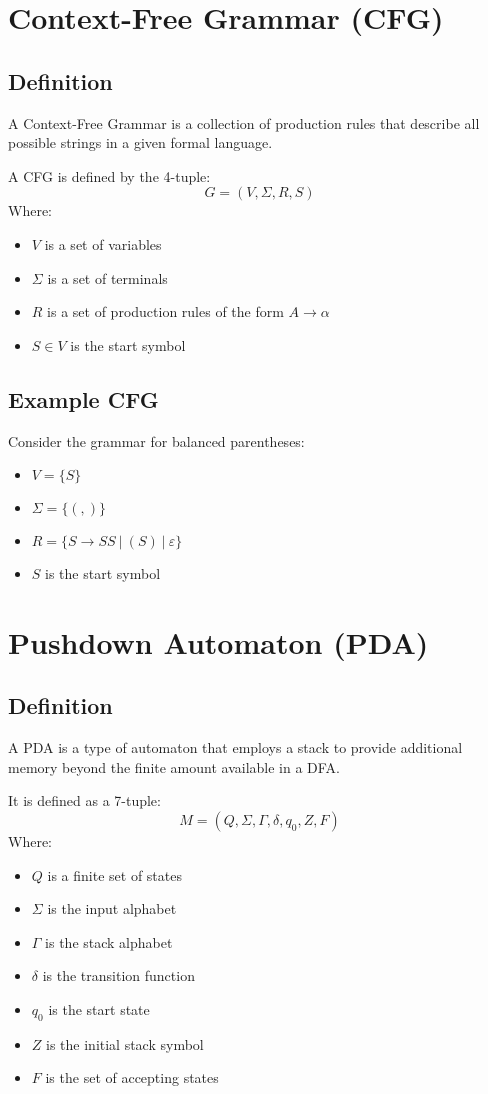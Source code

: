 \documentclass[12pt]{article}
\begin{document}
\newpage
\section{Context-Free Grammar (CFG)}
\subsection{Definition}
A Context-Free Grammar is a collection of production rules that describe all possible strings in a given formal language.

A CFG is defined by the 4-tuple:
\[ G = (V, \Sigma, R, S) \]
Where:
\begin{itemize}
    \item $V$ is a set of variables
    \item $\Sigma$ is a set of terminals
    \item $R$ is a set of production rules of the form $A \rightarrow \alpha$
    \item $S \in V$ is the start symbol
\end{itemize}

\subsection{Example CFG}
Consider the grammar for balanced parentheses:
\begin{itemize}
    \item $V = \{S\}$
    \item $\Sigma = \{(,)\}$
    \item $R = \{ S \rightarrow SS \ |\ (S) \ |\ \varepsilon \}$
    \item $S$ is the start symbol
\end{itemize}

\section{Pushdown Automaton (PDA)}
\subsection{Definition}
A PDA is a type of automaton that employs a stack to provide additional memory beyond the finite amount available in a DFA.

It is defined as a 7-tuple:
\[ M = (Q, \Sigma, \Gamma, \delta, q_0, Z, F) \]
Where:
\begin{itemize}
    \item $Q$ is a finite set of states
    \item $\Sigma$ is the input alphabet
    \item $\Gamma$ is the stack alphabet
    \item $\delta$ is the transition function
    \item $q_0$ is the start state
    \item $Z$ is the initial stack symbol
    \item $F$ is the set of accepting states
\end{itemize}
\end{document}
